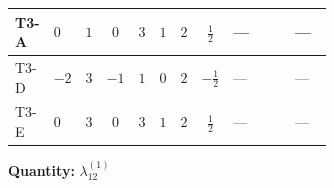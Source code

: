 \documentclass[8pt]{article}
\begin{document}
\begin{landscape}
\begin{longtable}{@{}llcccccc >{\raggedright\arraybackslash}p{0.21\linewidth} >{\raggedright\arraybackslash}p{0.21\linewidth} >{\raggedright\arraybackslash}p{0.21\linewidth}@{}}
\midrule
T3-A & $0$ & $1$ & $0$ & $3$ & $1$ & $2$ & $\frac{1}{2}$ & --- & \scriptsize\adjustbox{max width=\linewidth}{$\begin{gathered} +4 {\lambda_{HS_1}^{(1)}} {\lambda_{HS_2}^{(1)}}\end{gathered}$} & --- \\
\midrule
T3-D & $-2$ & $3$ & $-1$ & $1$ & $0$ & $2$ & $-\frac{1}{2}$ & --- & \scriptsize\adjustbox{max width=\linewidth}{$\begin{gathered} +4 {\lambda_{HS_1}^{(1)}} {\lambda_{HS_2}^{(1)}}\end{gathered}$} & --- \\
\midrule
T3-E & $0$ & $3$ & $0$ & $3$ & $1$ & $2$ & $\frac{1}{2}$ & --- & \scriptsize\adjustbox{max width=\linewidth}{$\begin{gathered} +4 {\lambda_{HS_1}^{(1)}} {\lambda_{HS_2}^{(1)}}\end{gathered}$} & --- \\
\midrule
\bottomrule
\end{longtable}
\clearpage
\noindent\textbf{Quantity: }$\lambda_{12}^{(1)}$\par\smallskip

\end{landscape}
\end{document}
